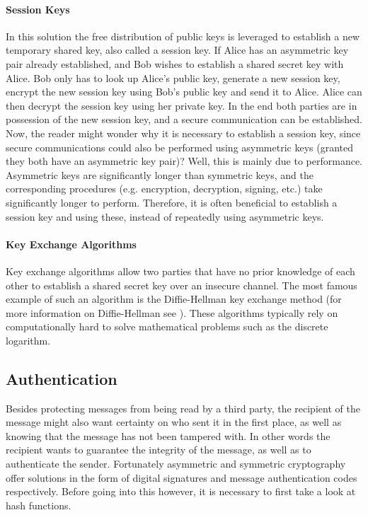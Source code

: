 \documentclass[11pt]{article}
\begin{document}
\paragraph{Session Keys} In this solution the free distribution of public keys is leveraged to establish a new temporary shared key, also called a session key. If Alice has an asymmetric key pair already established, and Bob wishes to establish a shared secret key with Alice. Bob only has to look up Alice's public key, generate a new session key, encrypt the new session key using Bob's public key and send it to Alice. Alice can then decrypt the session key using her private key. In the end both parties are in possession of the new session key, and a secure communication can be established. Now, the reader might wonder why it is necessary to establish a session key, since secure communications could also be performed using asymmetric keys (granted they both have an asymmetric key pair)? Well, this is mainly due to performance. Asymmetric keys are significantly longer than symmetric keys, and the corresponding procedures (e.g. encryption, decryption, signing, etc.) take significantly longer to perform. Therefore, it is often beneficial to establish a session key and using these, instead of repeatedly using asymmetric keys.

\paragraph{Key Exchange Algorithms} Key exchange algorithms allow two parties that have no prior knowledge of each other to establish a shared secret key over an insecure channel. The most famous example of such an algorithm is the Diffie-Hellman key exchange method (for more information on Diffie-Hellman see \cite{DiffieHellmanwiki}). These algorithms typically rely on computationally hard to solve mathematical problems such as the discrete logarithm.

\subsection{Authentication} Besides protecting messages from being read by a third party, the recipient of the message might also want certainty on who sent it in the first place, as well as knowing that the message has not been tampered with. In other words the recipient wants to guarantee the integrity of the message, as well as to authenticate the sender. Fortunately asymmetric and symmetric cryptography offer solutions in the form of digital signatures and message authentication codes respectively. Before going into this however, it is necessary to first take a look at hash functions.
\end{document}

